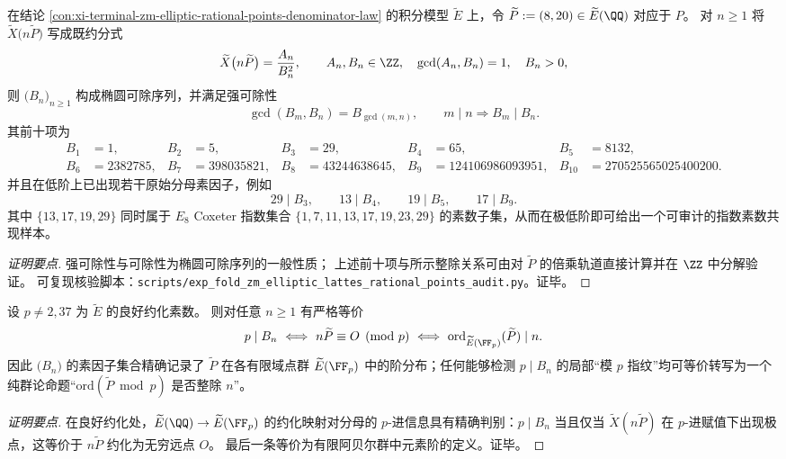 

\begin{conclusion}\label{con:xi-terminal-zm-elliptic-eds-strong-divisibility}
在结论 \ref{con:xi-terminal-zm-elliptic-rational-points-denominator-law} 的积分模型 \(\widetilde E\) 上，令
\(
\widetilde P:=(8,20)\in\widetilde E(\QQ)
\)
对应于 \(P\)。
对 \(n\ge 1\) 将 \(\widetilde X\bigl(n\widetilde P\bigr)\) 写成既约分式
\[
\widetilde X\bigl(n\widetilde P\bigr)=\frac{A_n}{B_n^2},
\qquad
A_n,B_n\in\ZZ,\quad \gcd(A_n,B_n)=1,\quad B_n>0,
\]
则 \(\bigl(B_n\bigr)_{n\ge 1}\) 构成椭圆可除序列，并满足强可除性
\[
\gcd(B_m,B_n)=B_{\gcd(m,n)},
\qquad
m\mid n\Longrightarrow B_m\mid B_n.
\]
其前十项为
\[
\begin{aligned}
B_1&=1,&
B_2&=5,&
B_3&=29,&
B_4&=65,&
B_5&=8132,\\
B_6&=2382785,&
B_7&=398035821,&
B_8&=43244638645,&
B_9&=124106986093951,&
B_{10}&=270525565025400200.
\end{aligned}
\]
并且在低阶上已出现若干原始分母素因子，例如
\[
29\mid B_3,\qquad 13\mid B_4,\qquad 19\mid B_5,\qquad 17\mid B_9.
\]
其中 \(\{13,17,19,29\}\) 同时属于 \(E_8\) Coxeter 指数集合 \(\{1,7,11,13,17,19,23,29\}\) 的素数子集，从而在极低阶即可给出一个可审计的指数素数共现样本。
\end{conclusion}
\begin{proof}[证明要点]
强可除性与可除性为椭圆可除序列的一般性质；
上述前十项与所示整除关系可由对 \(\widetilde P\) 的倍乘轨道直接计算并在 \(\ZZ\) 中分解验证。
可复现核验脚本：\texttt{scripts/exp\_fold\_zm\_elliptic\_lattes\_rational\_points\_audit.py}。证毕。
\end{proof}

\begin{conclusion}\label{con:xi-terminal-zm-elliptic-eds-modp-order-equivalence}
设 \(p\neq 2,37\) 为 \(\widetilde E\) 的良好约化素数。
则对任意 \(n\ge 1\) 有严格等价
\[
p\mid B_n
\ \Longleftrightarrow\
n\widetilde P\equiv O\pmod p
\ \Longleftrightarrow\
\mathrm{ord}_{\widetilde E(\FF_p)}(\widetilde P)\mid n.
\]
因此 \(\bigl(B_n\bigr)\) 的素因子集合精确记录了 \(\widetilde P\) 在各有限域点群 \(\widetilde E(\FF_p)\) 中的阶分布；任何能够检测 \(p\mid B_n\) 的局部“模 \(p\) 指纹”均可等价转写为一个纯群论命题“\(\mathrm{ord}(\widetilde P\bmod p)\) 是否整除 \(n\)”。
\end{conclusion}
\begin{proof}[证明要点]
在良好约化处，\(\widetilde E(\QQ)\to\widetilde E(\FF_p)\) 的约化映射对分母的 \(p\)-进信息具有精确判别：\(p\mid B_n\) 当且仅当 \(\widetilde X(n\widetilde P)\) 在 \(p\)-进赋值下出现极点，这等价于 \(n\widetilde P\) 约化为无穷远点 \(O\)。
最后一条等价为有限阿贝尔群中元素阶的定义。证毕。
\end{proof}

